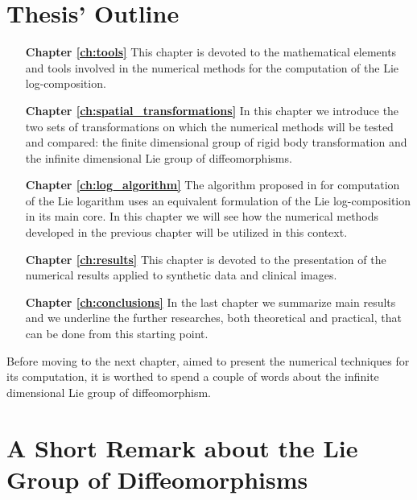 \section{Thesis' Outline}\label{se:thesis_outline}
\begin{enumerate}
	
	\item[{\bf Chapter \ref{ch:tools}}] This chapter is devoted to the mathematical elements and tools involved in the numerical methods for the computation of the Lie log-composition.
	
	\item[{\bf Chapter \ref{ch:spatial_transformations}}] In this chapter we introduce the two sets of transformations on which the numerical methods will be tested and compared: the finite dimensional group of rigid body transformation and the infinite dimensional Lie group of diffeomorphisms.

	\item[{\bf Chapter \ref{ch:log_algorithm}}] The algorithm proposed in \cite{bossa2008algorithms} for computation of the Lie logarithm uses an equivalent formulation of the Lie log-composition in its main core. In this chapter we will see how the numerical methods developed in the previous chapter will be utilized in this context.
  
	\item[{\bf Chapter \ref{ch:results}}] This chapter is devoted to the presentation of the numerical results applied to synthetic data and clinical images. 
	
	\item[{\bf Chapter \ref{ch:conclusions}}] In the last chapter we summarize main results and we underline the further researches, both theoretical and practical, that can be done from this starting point.
	
\end{enumerate}

Before moving to the next chapter, aimed to present the numerical techniques for its computation, it is worthed to spend a couple of words about the infinite dimensional Lie group of diffeomorphism.

\section*{A Short Remark about the Lie Group of Diffeomorphisms}\label{remark_diff}

